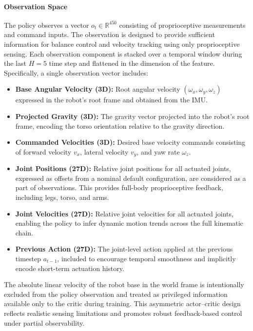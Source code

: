 \paragraph{Observation Space}
\label{sec:obs_space}
The policy observes a vector $o_t \in \mathbb{R}^{450}$ consisting of proprioceptive measurements and command inputs.
The observation is designed to provide sufficient information for balance control and velocity tracking using only proprioceptive sensing. Each observation component is stacked over a temporal window during the last $H=5$
time step and flattened in the dimension of the feature. Specifically, a single observation vector includes:
\begin{itemize}
    \item \textbf{Base Angular Velocity (3D):}
    Root angular velocity $(\omega_x, \omega_y, \omega_z)$ expressed in the robot’s root frame and obtained from the IMU.

    \item \textbf{Projected Gravity (3D):}
    The gravity vector projected into the robot’s root frame, encoding the torso orientation relative to the gravity direction.

    \item \textbf{Commanded Velocities (3D):}
    Desired base velocity commands consisting of forward velocity $v_x$, lateral velocity $v_y$, and yaw rate $\omega_z$.

    \item \textbf{Joint Positions (27D):}
    Relative joint positions for all actuated joints, expressed as offsets from a nominal default configuration, are considered as a part of observations. This provides full-body proprioceptive feedback, including legs, torso, and arms.

    \item \textbf{Joint Velocities (27D):}
    Relative joint velocities for all actuated joints, enabling the policy to infer dynamic motion trends across the full kinematic chain.

    \item \textbf{Previous Action (27D):}
    The joint-level action applied at the previous timestep $a_{t-1}$, included to encourage temporal smoothness and implicitly encode short-term actuation history.
\end{itemize}

The absolute linear velocity of the robot base in the world frame is intentionally excluded from the policy observation and treated as privileged information available only to the critic during training. This asymmetric actor--critic \citep{pinto2017asymmetricactorcriticimagebased} design reflects realistic sensing limitations and promotes robust feedback-based control under partial observability.


